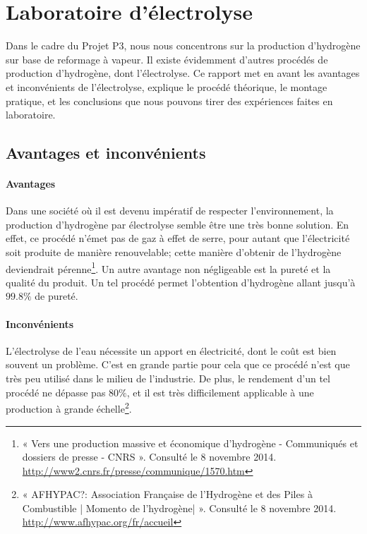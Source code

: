 \documentclass[10pt]{article}
\begin{document}
\section*{Laboratoire d'électrolyse}


Dans le cadre du Projet P3, nous nous concentrons sur la production d'hydrogène sur base de reformage à vapeur.
Il existe évidemment d'autres procédés de production d'hydrogène, dont l'électrolyse. Ce rapport met en avant les
avantages et inconvénients de l'électrolyse, explique le procédé théorique, le montage pratique, et les conclusions 
que nous pouvons tirer des expériences faites en laboratoire.

\subsection*{Avantages et inconvénients}

\paragraph{Avantages} Dans une société où il est devenu impératif de respecter l'environnement, la production 
d'hydrogène par électrolyse semble être une très bonne solution. En effet, ce procédé n'émet pas de gaz à effet de
serre, pour autant que l'électricité soit produite de manière renouvelable; cette manière d'obtenir de l'hydrogène 
deviendrait pérenne\footnote{« Vers une production massive et économique d’hydrogène - Communiqués et dossiers de 
presse - CNRS ». Consulté le 8 novembre 2014. \url{http://www2.cnrs.fr/presse/communique/1570.htm}}. Un autre avantage non 
négligeable est la pureté et la qualité du produit. Un tel procédé permet l'obtention d'hydrogène allant jusqu'à
$99.8 \%$ de pureté.

\paragraph{Inconvénients} L'électrolyse de l'eau nécessite un apport en électricité, dont le coût est bien souvent 
un problème. C'est en grande partie pour cela que ce procédé n'est que très peu utilisé dans le milieu de l'industrie. 
De plus, le rendement d'un tel procédé ne dépasse pas $80 \%$, et il est très difficilement applicable à une production 
à grande échelle\footnote{« AFHYPAC?: Association Française de l’Hydrogène et des Piles à Combustible | Momento de 
l'hydrogène| ». Consulté le 8 novembre 2014. \url{http://www.afhypac.org/fr/accueil}}.
\end{document}
